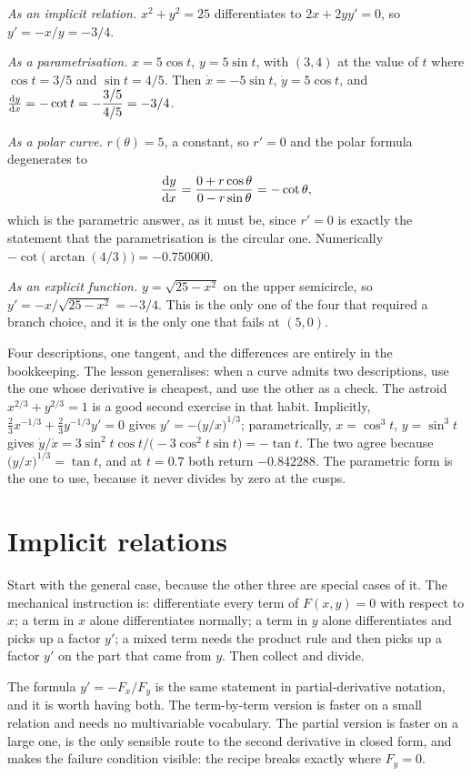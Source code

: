 \emph{As an implicit relation.} $x^{2}+y^{2}=25$ differentiates to $2x+2yy'=0$, so $y'=-x/y=-3/4$.

\emph{As a parametrisation.} $x=5\cos t$, $y=5\sin t$, with $(3,4)$ at the value of $t$ where $\cos t=3/5$ and $\sin t=4/5$. Then $\dot x=-5\sin t$, $\dot y=5\cos t$, and $\frac{\mathrm{d}y}{\mathrm{d}x}=-\cot t=-\dfrac{3/5}{4/5}=-3/4$.

\emph{As a polar curve.} $r(\theta)=5$, a constant, so $r'=0$ and the polar formula degenerates to
\[
\frac{\mathrm{d}y}{\mathrm{d}x}=\frac{0+r\cos\theta}{0-r\sin\theta}=-\cot\theta,
\]
which is the parametric answer, as it must be, since $r'=0$ is exactly the statement that the parametrisation is the circular one. Numerically $-\cot\bigl(\arctan(4/3)\bigr)=-0.750000$.

\emph{As an explicit function.} $y=\sqrt{25-x^{2}}$ on the upper semicircle, so $y'=-x/\sqrt{25-x^{2}}=-3/4$. This is the only one of the four that required a branch choice, and it is the only one that fails at $(5,0)$.

Four descriptions, one tangent, and the differences are entirely in the bookkeeping. The lesson generalises: when a curve admits two descriptions, use the one whose derivative is cheapest, and use the other as a check. The astroid $x^{2/3}+y^{2/3}=1$ is a good second exercise in that habit. Implicitly, $\tfrac23x^{-1/3}+\tfrac23y^{-1/3}y'=0$ gives $y'=-\bigl(y/x\bigr)^{1/3}$; parametrically, $x=\cos^{3}t$, $y=\sin^{3}t$ gives $\dot y/\dot x=3\sin^{2}t\cos t\big/\bigl(-3\cos^{2}t\sin t\bigr)=-\tan t$. The two agree because $\bigl(y/x\bigr)^{1/3}=\tan t$, and at $t=0.7$ both return $-0.842288$. The parametric form is the one to use, because it never divides by zero at the cusps.

\section{Implicit relations}

Start with the general case, because the other three are special cases of it. The mechanical instruction is: differentiate every term of $F(x,y)=0$ with respect to $x$; a term in $x$ alone differentiates normally; a term in $y$ alone differentiates and picks up a factor $y'$; a mixed term needs the product rule and then picks up a factor $y'$ on the part that came from $y$. Then collect and divide.

The formula $y'=-F_{x}/F_{y}$ is the same statement in partial-derivative notation, and it is worth having both. The term-by-term version is faster on a small relation and needs no multivariable vocabulary. The partial version is faster on a large one, is the only sensible route to the second derivative in closed form, and makes the failure condition visible: the recipe breaks exactly where $F_{y}=0$.


